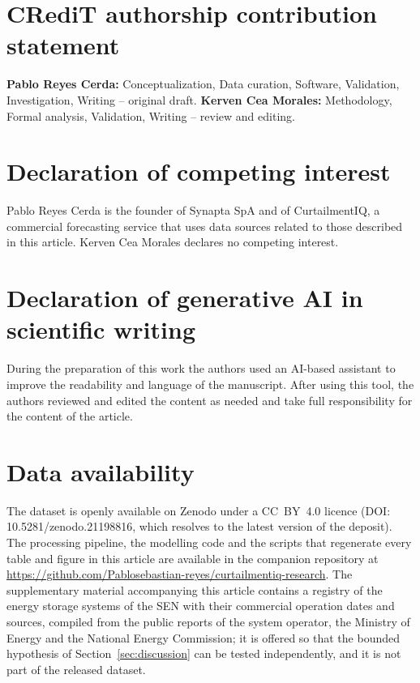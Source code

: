\documentclass[preprint,3p,times]{elsarticle}
\providecommand{\DIFaddtex}[1]{{\protect\color{blue} \sf #1}} %
\providecommand{\DIFaddbegin}{} %
\providecommand{\DIFaddend}{} %
\providecommand{\DIFadd}[1]{\texorpdfstring{\DIFaddtex{#1}}{#1}} %
\begin{document}
\section*{CRediT authorship contribution statement}
\textbf{Pablo Reyes Cerda:} Conceptualization, Data curation, Software, Validation, Investigation, Writing -- original draft. \textbf{Kerven Cea Morales:} Methodology, Formal analysis, Validation, Writing -- review and editing.

\section*{Declaration of competing interest}
Pablo Reyes Cerda is the founder of Synapta SpA and of CurtailmentIQ, a commercial forecasting service that uses data sources related to those described in this article. Kerven Cea Morales declares no competing interest.

\section*{Declaration of generative AI in scientific writing}
During the preparation of this work the authors used an AI-based assistant to improve the readability and language of the manuscript. After using this tool, the authors reviewed and edited the content as needed and take full responsibility for the content of the article.

\section*{Data availability}
The dataset is openly available on Zenodo under a CC~BY~4.0 licence (DOI: 10.5281/zenodo.21198816, which resolves to the latest version of the deposit). The processing pipeline, the modelling code and the scripts that regenerate every table and figure in this article are available in the companion repository at \url{https://github.com/Pablosebastian-reyes/curtailmentiq-research}. \DIFaddbegin \DIFadd{The supplementary material accompanying this article contains a registry of the energy storage systems of the SEN with their commercial operation dates and sources, compiled from the public reports of the system operator, the Ministry of Energy and the National Energy Commission; it is offered so that the bounded hypothesis of Section~\ref{sec:discussion} can be tested independently, and it is not part of the released dataset.
}\DIFaddend 
\end{document}
